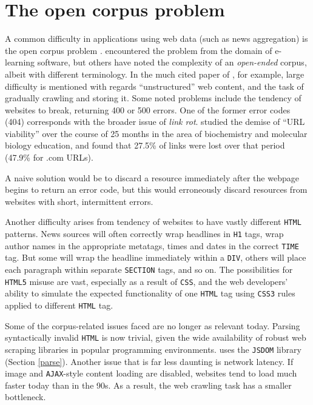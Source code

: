 \section{The open corpus problem\label{corpus}}

A common difficulty in applications using web data (such as
news aggregation) is the open
corpus problem \cite{henze2001, brusilovsky2007, koidl}.
\citeauthor{henze2001}
encountered the problem from the domain of e-learning
software, but others have noted the complexity of an
{\it open-ended} corpus, albeit with different terminology.
In the much cited paper of , for example,
large difficulty is mentioned with regards ``unstructured''
web content, and the task of gradually crawling and storing
it.  Some noted problems include the tendency of websites to
break, returning 400 or 500 errors.  One of the former error codes
(404) corresponds with the broader issue of {\it link rot}.
 studied the demise of ``URL viability''
over the course of 25 months in the area of
biochemistry and molecular biology education, and found that
27.5\% of links were lost over that period (47.9\% for .com
URLs).

A naive solution would be to discard a resource immediately
after the webpage begins to return an error code, but this
would erroneously discard resources from websites with
short, intermittent errors.

Another difficulty arises from tendency of websites to have
vastly different {\tt HTML} patterns.  News sources will often correctly
wrap headlines in {\tt H1} tags, wrap author names in the
appropriate metatags, times and dates in the correct {\tt TIME} tag.
But some will wrap the headline immediately within a {\tt DIV},
others will place each paragraph within separate {\tt SECTION} tags, and
so on. The possibilities for {\tt HTML5} misuse are vast, especially
as a result of {\tt CSS}, and the web developers' ability to
simulate the expected functionality of one {\tt HTML} tag using
{\tt CSS3} rules applied to different {\tt HTML} tag.

Some of the corpus-related issues  faced are no longer as
relevant today.  Parsing syntactically invalid {\tt HTML} is
now trivial, given the wide availability of robust web scraping
libraries in popular programming environments.
\nr{} uses the {\tt JSDOM} library (Section \ref{parse}).  Another
issue that is far less daunting is network latency. If image and
{\tt AJAX}-style content loading are disabled, websites
tend to load much faster today than in the 90s.  As a result,
the web crawling task has a smaller bottleneck.

